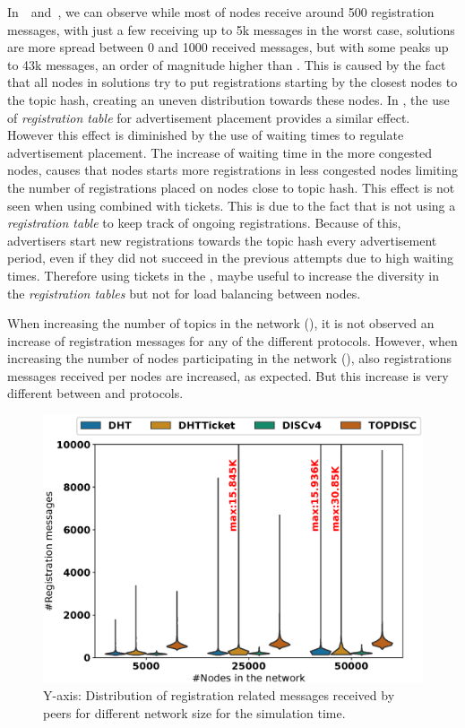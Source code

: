 In~~and~,  we can observe while most of \sysname nodes receive around 500 registration messages,  with just a few receiving up to 5k messages in the worst case,  \altname solutions are more spread between 0 and 1000 received messages, but with some peaks up to 43k messages,  an order of magnitude higher than \sysname.
This is caused by the fact that all nodes in \altname solutions try to put registrations starting by the closest nodes to the topic hash,  creating an uneven distribution  towards these nodes. 
In \sysname, the use of \emph{registration table} for advertisement placement provides a similar effect. 
However this effect is diminished by the use of waiting times to regulate advertisement placement.  The increase of waiting time in the more congested nodes, causes that nodes starts more registrations in less congested nodes limiting the number of registrations placed on nodes close to topic hash.
This effect is not seen when using \altname combined with tickets. 
This is due to the fact that \altname is not using a \emph{registration table} to keep track of ongoing registrations.  Because of this,  advertisers start new registrations towards the topic hash every advertisement period, even if they did not succeed in the previous attempts due to high waiting times.
Therefore using tickets in the \altnameticket, maybe useful to increase the diversity in the \emph{registration tables} but not for load balancing between nodes.

When increasing the number of topics in the network (), it is not observed an increase of registration messages for any of the different protocols. 
However,  when increasing the number of nodes participating in the network (),  also registrations messages received per nodes are increased, as expected.
But this increase is very different between \sysname and \altname protocols.

\begin{figure}[!h]
\centering
\includegraphics[width=\linewidth]{results/efficiency/violin_size_registrationMsgs.eps}
\caption{Y-axis: Distribution of registration related messages received by peers for different network size for the simulation time.}
\label{fig:regMsgsPerSize}
\end{figure}

